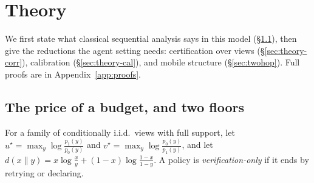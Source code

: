 \section{Theory}
\label{sec:theory}

We first state what classical sequential analysis says in this model (\S\ref{sec:theory-main}), then give the reductions the agent setting needs:
certification over views (\S\ref{sec:theory-corr}), calibration (\S\ref{sec:theory-cal}), and mobile structure (\S\ref{sec:twohop}).
Full proofs are in Appendix~\ref{app:proofs}.

\subsection{The price of a budget, and two floors}
\label{sec:theory-main}
For a family of conditionally i.i.d.\ views with full support, let $u^\star=\max_y\log\frac{p_1(y)}{p_0(y)}$ and $v^\star=\max_y\log\frac{p_0(y)}{p_1(y)}$, and let
$d(x\|y)=x\log\frac{x}{y}+(1-x)\log\frac{1-x}{1-y}$. A policy is \emph{verification-only} if it ends by retrying or declaring.

